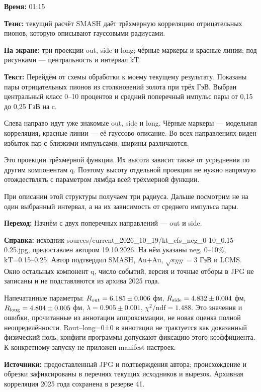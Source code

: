 \textbf{Время:} 01:15

\textbf{Тезис:} текущий расчёт SMASH даёт трёхмерную корреляцию отрицательных пионов, которую описывают гауссовыми радиусами.

\textbf{На экране:} три проекции out, side и long; чёрные маркеры и красные линии; под рисунками — центральность и интервал kT.

\textbf{Текст:} Перейдём от схемы обработки к моему текущему результату. Показаны пары отрицательных пионов из столкновений золота при трёх ГэВ. Выбран центральный класс 0–10 процентов и средний поперечный импульс пары от 0,15 до 0,25 ГэВ на c.

Слева направо идут уже знакомые out, side и long. Чёрные маркеры — модельная корреляция, красные линии — её гауссово описание. Во всех направлениях виден избыток пар с близкими импульсами; ширины различаются.

Это проекции трёхмерной функции. Их высота зависит также от усреднения по другим компонентам q. Поэтому высоту отдельной проекции не нужно напрямую отождествлять с параметром лямбда всей трёхмерной функции.

При описании этой структуры получаем три радиуса. Дальше посмотрим не на один выбранный интервал, а на их зависимость от среднего импульса пары.

\textbf{Переход:} Начнём с двух поперечных направлений — out и side.

\textbf{Справка:} исходник sources/current\_2026\_10\_19/kt\_cfs\_neg\_0-10\_0.15-0.25.jpg, предоставлен автором 19.10.2026. На нём указаны neg, 0–10\%, kT=0.15–0.25. Автор подтвердил SMASH, Au+Au, \(\sqrt{s_{NN}}=3\) ГэВ и LCMS. Окно остальных компонент q, число событий, версия и точные отборы в JPG не записаны и не подставляются из архива 2025 года.

Напечатанные параметры: \(R_{\rm out}=6.185\pm0.006\) фм, \(R_{\rm side}=4.832\pm0.004\) фм, \(R_{\rm long}=4.804\pm0.005\) фм, \(\lambda=0.905\pm0.001\), \(\chi^2/\mathrm{ndf}=1.488\). Это значения и ошибки, прочитанные из аннотации аппроксимации, не новая оценка полной неопределённости. Rout–long=0±0 в аннотации не трактуется как доказанный физический ноль; конфиги программы допускают фиксацию этого коэффициента. К конкретному запуску не приложен manifest настроек.

\textbf{Источники:} предоставленный JPG и подтверждения автора; происхождение и обрезки зафиксированы в перечнях текущих исходников и вырезок. Архивная корреляция 2025 года сохранена в резерве 41.
